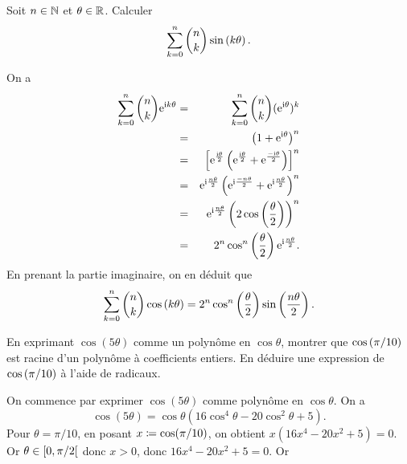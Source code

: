 \documentclass{magnolia}
\begin{document}
\begin{exos}
\exo Soit $n\in\mathbb{N}$ et $\theta\in\mathbb{R}$. Calculer
  \[\sum_{k=0}^n \binom{n}{k}\sin\left(k\theta\right).\]
  \begin{sol}
  On a
  \begin{eqnarray*}
 \sum_{k=0}^{n}\binom{n}{k}{\rm e}^{{\rm i} k\theta}
 &=& \sum_{k=0}^{n}\binom{n}{k}({\rm e}^{{\rm i}\theta})^k\\
 &=& \left(1+{\rm e}^{{\rm i}\theta}\right)^n\\
 &=& \left[{\rm e}^{\frac{{\rm i}\theta}{2}}\left({\rm e}^{\frac{{\rm i}\theta}{2}}+{\rm e}^{\frac{-{\rm i}\theta}{2}}\right)\right]^n\\
 &=& {\rm e}^{{\rm i}\frac{n\theta}{2}}\left( {\rm e}^{{\rm i}\frac{-n\theta}{2}}+{\rm e}^{{\rm i}\frac{n\theta}{2}}\right)^{n}\\
 &=& {\rm e}^{{\rm i}\frac{n\theta}{2}}\left( 2\cos\left( \frac{\theta}{2}\right) \right) ^{n}\\
 &=& 2^n \cos^n\left(\frac{\theta}{2}\right){\rm e}^{{\rm i}\frac{n\theta}{2}}.
  \end{eqnarray*}
  En prenant la partie imaginaire, on en déduit que
  \[\sum_{k=0}^n \binom{n}{k}\cos\left(k\theta\right)=2^n \cos^n\left(\frac{\theta}{2}\right)\sin\left(\frac{n\theta}{2}\right).\]
  \end{sol}
\exo En exprimant $\cos(5\theta)$ comme un polynôme en $\cos\theta$,
  montrer que $\cos\left(\pi/10\right)$ est racine d'un polynôme à
  coefficients entiers. En déduire une expression de $\cos\left(\pi/10\right)$ à l'aide de radicaux.
\begin{sol}
On commence par exprimer $\cos(5\theta)$ comme polynôme en $\cos\theta$. On a
\[\cos (5\theta)=\cos \theta(16\cos^{4}\theta -20\cos^{2}\theta +5).\]
Pour $\theta=\pi/10$, en posant $x\coloneqq\cos(\pi/10)$, on obtient $x(16x^4-20x^2+5)=0$. Or $\theta\in\left[0,\pi/2\right[$ donc $x>0$, donc $16x^4-20x^2+5=0$. Or

\end{sol}
\end{exos}
\end{document}
